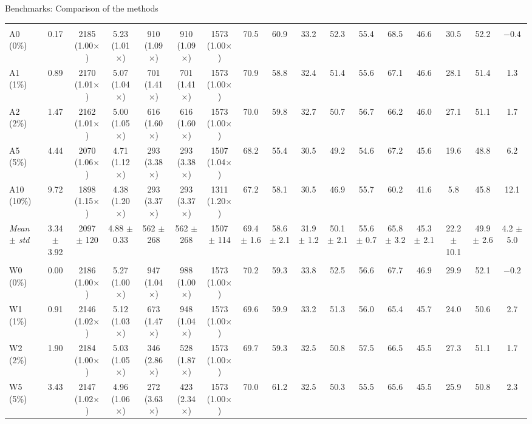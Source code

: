 \documentclass[aspectratio=169,10pt]{beamer}
\begin{document}
\begin{frame}{Benchmarks: Comparison of the methods}{}
\begin{table}
\begin{adjustbox}{width=\linewidth, totalheight=0.64\textheight, keepaspectratio, center}
{\begin{tabular}{lcccccccccccccccc}
\addlinespace
\multicolumn{17}{l}{\emph{Hardware-aware, A100, 2 objectives: fastest decode step}} \\
A0 (0\%) & 0.17 & 2185 (1.00$\times$) & 5.23 (1.01$\times$) & 910 (1.09$\times$) & 910 (1.09$\times$) & 1573 (1.00$\times$) & 70.5 & 60.9 & 33.2 & 52.3 & 55.4 & 68.5 & 46.6 & 30.5 & 52.2 & $-0.4$ \\
A1 (1\%) & 0.89 & 2170 (1.01$\times$) & 5.07 (1.04$\times$) & 701 (1.41$\times$) & 701 (1.41$\times$) & 1573 (1.00$\times$) & 70.9 & 58.8 & 32.4 & 51.4 & 55.6 & 67.1 & 46.6 & 28.1 & 51.4 & 1.3 \\
A2 (2\%) & 1.47 & 2162 (1.01$\times$) & 5.00 (1.05$\times$) & 616 (1.60$\times$) & 616 (1.60$\times$) & 1573 (1.00$\times$) & 70.0 & 59.8 & 32.7 & 50.7 & 56.7 & 66.2 & 46.0 & 27.1 & 51.1 & 1.7 \\
A5 (5\%) & 4.44 & 2070 (1.06$\times$) & 4.71 (1.12$\times$) & 293 (3.38$\times$) & 293 (3.38$\times$) & 1507 (1.04$\times$) & 68.2 & 55.4 & 30.5 & 49.2 & 54.6 & 67.2 & 45.6 & 19.6 & 48.8 & 6.2 \\
A10 (10\%) & 9.72 & 1898 (1.15$\times$) & 4.38 (1.20$\times$) & 293 (3.37$\times$) & 293 (3.37$\times$) & 1311 (1.20$\times$) & 67.2 & 58.1 & 30.5 & 46.9 & 55.7 & 60.2 & 41.6 & 5.8 & 45.8 & 12.1 \\
\emph{Mean $\pm$ std} & 3.34 $\pm$ 3.92 & 2097 $\pm$ 120 & 4.88 $\pm$ 0.33 & 562 $\pm$ 268 & 562 $\pm$ 268 & 1507 $\pm$ 114 & 69.4 $\pm$ 1.6 & 58.6 $\pm$ 2.1 & 31.9 $\pm$ 1.2 & 50.1 $\pm$ 2.1 & 55.6 $\pm$ 0.7 & 65.8 $\pm$ 3.2 & 45.3 $\pm$ 2.1 & 22.2 $\pm$ 10.1 & 49.9 $\pm$ 2.6 & 4.2 $\pm$ 5.0 \\
\addlinespace
\multicolumn{17}{l}{\emph{Mix with sharing: least stored size}} \\
W0 (0\%) & 0.00 & 2186 (1.00$\times$) & 5.27 (1.00$\times$) & 947 (1.04$\times$) & 988 (1.00$\times$) & 1573 (1.00$\times$) & 70.2 & 59.3 & 33.8 & 52.5 & 56.6 & 67.7 & 46.9 & 29.9 & 52.1 & $-0.2$ \\
W1 (1\%) & 0.91 & 2146 (1.02$\times$) & 5.12 (1.03$\times$) & 673 (1.47$\times$) & 948 (1.04$\times$) & 1573 (1.00$\times$) & 69.6 & 59.9 & 33.2 & 51.3 & 56.0 & 65.4 & 45.7 & 24.0 & 50.6 & 2.7 \\
W2 (2\%) & 1.90 & 2184 (1.00$\times$) & 5.03 (1.05$\times$) & 346 (2.86$\times$) & 528 (1.87$\times$) & 1573 (1.00$\times$) & 69.7 & 59.3 & 32.5 & 50.8 & 57.5 & 66.5 & 45.5 & 27.3 & 51.1 & 1.7 \\
W5 (5\%) & 3.43 & 2147 (1.02$\times$) & 4.96 (1.06$\times$) & 272 (3.63$\times$) & 423 (2.34$\times$) & 1573 (1.00$\times$) & 70.0 & 61.2 & 32.5 & 50.3 & 55.5 & 65.6 & 45.5 & 25.9 & 50.8 & 2.3 \\

\end{tabular}}
\end{adjustbox}
\end{table}
\end{frame}
\end{document}
